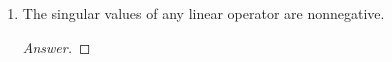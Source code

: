 \documentclass[../psets.tex]{subfiles}
\begin{document}
\begin{enumerate}[label={\textbf{3.\arabic*.}}]
\begin{enumerate}
\begin{proof}[Answer]
            so $c^2s^2$ is an eigenvalue of $(cA)^*(cA)$. Therefore, $\sqrt{c^2s^2}=|c|s$ is a singular value of $cA$, as desired.
        \end{proof}
        \item The singular values of any linear operator are nonnegative.
        \begin{proof}[Answer]


\end{proof}
\end{enumerate}
\end{enumerate}
\end{document}
